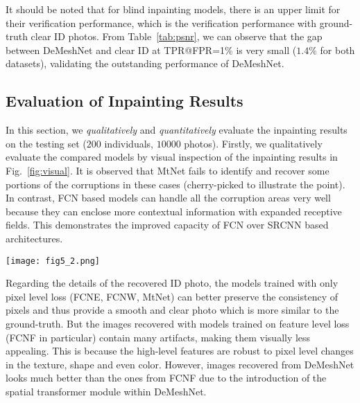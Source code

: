\documentclass[10pt,twocolumn,letterpaper]{article}
\begin{document}
It should be noted that for blind inpainting models, there is an upper limit for their verification performance, which is the verification performance with ground-truth clear ID photos. From Table~\ref{tab:psnr}, we can observe that the gap between DeMeshNet and clear ID at TPR@FPR=1\% is very small ($1.4\%$ for both datasets), validating the outstanding performance of DeMeshNet.




\subsection{Evaluation of Inpainting Results} In this section, we \textit{qualitatively} and \textit{quantitatively} evaluate the inpainting results on the testing set ($200$ individuals, $10000$ photos).
Firstly, we qualitatively evaluate the compared models by visual inspection of the inpainting results in Fig.~\ref{fig:visual}. It is observed that MtNet fails to identify and recover some portions of the corruptions in these cases (cherry-picked to illustrate the point). In contrast, FCN based models can handle all the corruption areas very well because they can enclose more contextual information with expanded receptive fields. This demonstrates the improved capacity of FCN over SRCNN based architectures.
\begin{figure*}
  \centering
    \texttt{[image: fig5\_2.png]}
    \caption{Visual inspection of the inpainting results. Although these inpainting results all look very well and are quite similar, they will lead to entirely different verification rates because of the different RMSE in the feature space.}
    \label{fig:visual} %
\end{figure*}

Regarding the details of the recovered ID photo, the models trained with only pixel level loss (FCNE, FCNW, MtNet) can better preserve the consistency of pixels and thus provide a smooth and clear photo which is more similar to the ground-truth. But the images recovered with models trained on feature level loss (FCNF in particular) contain many artifacts, making them visually less appealing. This is because the high-level features are robust to pixel level changes in the texture, shape and even color. However, images recovered from DeMeshNet looks much better than the ones from FCNF due to the introduction of the spatial transformer module within DeMeshNet.
\end{document}
